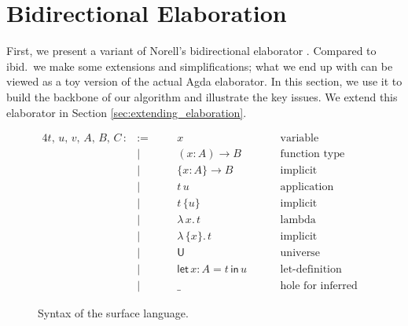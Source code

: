 \documentclass[acmsmall,review,anonymous,prologue,dvipsnames]{acmart}\settopmatter{printfolios=true,printccs=false,printacmref=false}
\newcommand{\slet}{\boldsymbol{\mathsf{let}}}
\renewcommand{\sin}{\boldsymbol{\mathsf{in}}}
\renewcommand{\U}{\mathsf{U}}
\theoremstyle{remark}
\begin{document}
\section{Bidirectional Elaboration}
\label{sec:bidirectional_elaboration}

First, we present a variant of Norell's bidirectional elaborator
\cite[Chapter~3]{norell07thesis}. Compared to ibid.\ we make some extensions and
simplifications; what we end up with can be viewed as a toy version of the
actual Agda elaborator. In this section, we use it to build the backbone of our
algorithm and illustrate the key issues. We extend this elaborator in Section
\ref{sec:extending_elaboration}.
\begin{figure}[h]
\begin{alignat*}{4}
  t,\,u,\,v,\,A,\,B,\,C\, :&:=\quad  && x\hspace{8em}              & \text{variable}                 &  \\
                           & |       && (x : A)\to B               & \text{function type}            &  \\
                           & |       && \{x : A\}\to B             & \text{implicit function type}   &  \\
                           & |       && t\,u                       & \text{application}              &  \\
                           & |       && t\,\{u\}                   & \text{implicit application}     &  \\
                           & |       && \lambda\,x.\, t            & \text{lambda abstraction}       &  \\
                           & |       && \lambda\,\{x\}.\,t         & \text{implicit abstraction}     &  \\
                           & |       && \U                         & \text{universe}                 &  \\
                           & |       && \slet\,x : A = t\,\sin\, u & \text{let-definition}           &  \\
                           & |       && \_                         & \text{hole for inferred term}   &
\end{alignat*}
\caption{Syntax of the surface language.}
\label{fig:surface}
\end{figure}
\end{document}
